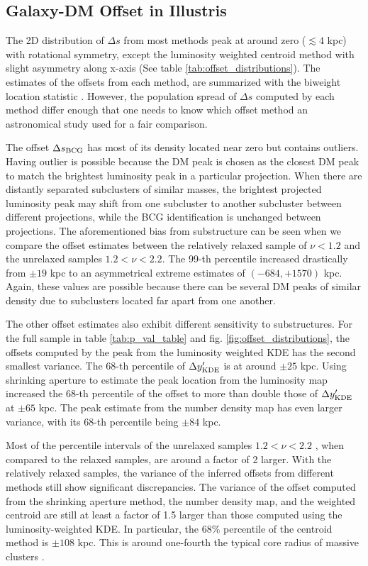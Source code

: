 \subsection{Galaxy-DM Offset in Illustris}

The 2D distribution of $\Delta s$ from most methods peak at
around zero ($\lesssim 4$ kpc) with rotational symmetry, 
except the luminosity weighted centroid method with slight asymmetry along x-axis
(See table \ref{tab:offset_distributions}).
The estimates of the offsets from each method, are summarized with the biweight 
location statistic \citep{Beers90}.
However, the population spread of $\Delta s$ computed by each method 
differ enough that one needs to know which offset method an astronomical study
used for a fair comparison. 

The offset $\Delta s_{\rm BCG}$ has most of its density located near zero but 
contains outliers. Having outlier is possible 
because the DM peak is chosen as the closest DM peak to match the
brightest luminosity peak in a particular projection.
When there are distantly separated subclusters of similar masses, 
the brightest projected luminosity peak 
may shift from one subcluster to another subcluster between different projections,
while the BCG identification is unchanged between projections.
The aforementioned bias from substructure can be seen when we compare the
offset estimates between the relatively relaxed sample of $\nu < 1.2$ and the
unrelaxed samples $1.2 < \nu < 2.2$. The 99-th percentile increased drastically
from $\pm 19$ kpc to an asymmetrical extreme estimates of $(-684, +1570)$ kpc.
Again, these values are possible because there can be several DM peaks of
similar density due to subclusters located far apart from one another.

The other offset estimates also exhibit different sensitivity to substructures.
For the full sample in table \ref{tab:p_val_table} and fig. 
\ref{fig:offset_distributions},
the offsets computed by the peak from the luminosity weighted KDE 
has the second smallest variance. The 68-th percentile of $\Delta y_{\rm
KDE}'$ is at around $\pm 25$ kpc. Using shrinking aperture to estimate
the peak location from the luminosity map increased the 68-th percentile of the
offset to more than double those of $\Delta y_{\rm KDE}'$ at $\pm 65$ kpc.
The peak estimate from the number density map has even larger variance, 
with its 68-th percentile being $\pm 84$ kpc. 

Most of the percentile intervals of the unrelaxed samples $ 1.2 < \nu < 2.2$ , 
when compared to the relaxed samples, are around a factor of 2 larger. 
With the relatively relaxed samples, the variance of the inferred offsets from different
methods still show significant discrepancies. 
The variance of the offset computed from the shrinking aperture method, 
the number density map, and the weighted centroid are still at least a factor of 1.5
larger than those computed using the luminosity-weighted KDE. 
In particular, the 68\% percentile of the centroid method is $\pm 108$ kpc.
This is around one-fourth the typical core radius of massive clusters
\cite{Allen1998}.  
 
